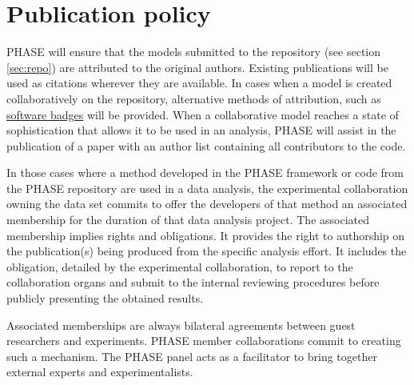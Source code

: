 \section{Publication policy}
\label{sec:publications}
PHASE will ensure that the models submitted to the repository (see section \ref{sec:repo}) are attributed to the original authors. Existing publications will be used as citations wherever they are available. In cases when a model is created collaboratively on the repository, alternative methods of attribution, such as \href{http://openbadges.org}{software badges} will be provided. When a collaborative model reaches a state of sophistication that allows it to be used in an analysis, PHASE will assist in the publication of a paper with an author list containing all contributors to the code.

In those cases where a method developed in the PHASE framework or code from the PHASE repository are used in a data analysis, the experimental collaboration owning the data set commits to offer the developers of that method an associated membership for the duration of that data analysis project. The associated membership implies rights and obligations. It provides the right to authorship on the publication(s) being produced from the specific analysis effort. It includes the obligation, detailed by the experimental collaboration, to report to the collaboration organs and submit to the internal reviewing procedures before publicly presenting the obtained results. 

Associated memberships are always bilateral agreements between guest researchers and experiments. PHASE member collaborations commit to creating such a mechanism. The PHASE panel acts as a facilitator to bring together external experts and experimentalists.
